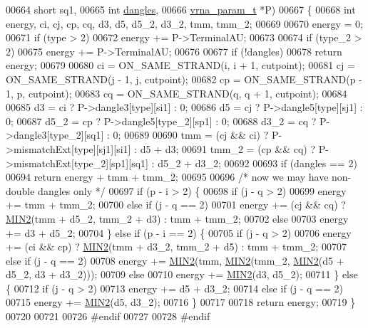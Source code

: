 \begin{DoxyCode}
00664              \textcolor{keywordtype}{short}        sq1,
00665              \textcolor{keywordtype}{int}          \hyperlink{group__model__details_ga72b511ed1201f7e23ec437e468790d74}{dangles},
00666              \hyperlink{group__energy__parameters_structvrna__param__s}{vrna\_param\_t} *P)
00667 \{
00668   \textcolor{keywordtype}{int} energy, ci, cj, cp, cq, d3, d5, d5\_2, d3\_2, tmm, tmm\_2;
00669 
00670   energy = 0;
00671   \textcolor{keywordflow}{if} (type > 2)
00672     energy += P->TerminalAU;
00673 
00674   \textcolor{keywordflow}{if} (type\_2 > 2)
00675     energy += P->TerminalAU;
00676 
00677   \textcolor{keywordflow}{if} (!dangles)
00678     \textcolor{keywordflow}{return} energy;
00679 
00680   ci  = ON\_SAME\_STRAND(i, i + 1, cutpoint);
00681   cj  = ON\_SAME\_STRAND(j - 1, j, cutpoint);
00682   cp  = ON\_SAME\_STRAND(p - 1, p, cutpoint);
00683   cq  = ON\_SAME\_STRAND(q, q + 1, cutpoint);
00684 
00685   d3    = ci  ? P->dangle3[type][si1]   : 0;
00686   d5    = cj  ? P->dangle5[type][sj1]   : 0;
00687   d5\_2  = cp  ? P->dangle5[type\_2][sp1] : 0;
00688   d3\_2  = cq  ? P->dangle3[type\_2][sq1] : 0;
00689 
00690   tmm   = (cj && ci) ? P->mismatchExt[type][sj1][si1]   : d5 + d3;
00691   tmm\_2 = (cp && cq) ? P->mismatchExt[type\_2][sp1][sq1] : d5\_2 + d3\_2;
00692 
00693   \textcolor{keywordflow}{if} (dangles == 2)
00694     \textcolor{keywordflow}{return} energy + tmm + tmm\_2;
00695 
00696   \textcolor{comment}{/* now we may have non-double dangles only */}
00697   \textcolor{keywordflow}{if} (p - i > 2) \{
00698     \textcolor{keywordflow}{if} (j - q > 2)
00699       energy += tmm + tmm\_2;
00700     \textcolor{keywordflow}{else} \textcolor{keywordflow}{if} (j - q == 2)
00701       energy += (cj && cq) ? \hyperlink{group__utils_gae0b9cd0ce090bd69b951aa73e8fa4f7d}{MIN2}(tmm + d5\_2, tmm\_2 + d3) : tmm + tmm\_2;
00702     \textcolor{keywordflow}{else}
00703       energy += d3 + d5\_2;
00704   \} \textcolor{keywordflow}{else} \textcolor{keywordflow}{if} (p - i == 2) \{
00705     \textcolor{keywordflow}{if} (j - q > 2)
00706       energy += (ci && cp) ? \hyperlink{group__utils_gae0b9cd0ce090bd69b951aa73e8fa4f7d}{MIN2}(tmm + d3\_2, tmm\_2 + d5) : tmm + tmm\_2;
00707     \textcolor{keywordflow}{else} \textcolor{keywordflow}{if} (j - q == 2)
00708       energy += \hyperlink{group__utils_gae0b9cd0ce090bd69b951aa73e8fa4f7d}{MIN2}(tmm, \hyperlink{group__utils_gae0b9cd0ce090bd69b951aa73e8fa4f7d}{MIN2}(tmm\_2, \hyperlink{group__utils_gae0b9cd0ce090bd69b951aa73e8fa4f7d}{MIN2}(d5 + d5\_2, d3 + d3\_2)));
00709     \textcolor{keywordflow}{else}
00710       energy += \hyperlink{group__utils_gae0b9cd0ce090bd69b951aa73e8fa4f7d}{MIN2}(d3, d5\_2);
00711   \} \textcolor{keywordflow}{else} \{
00712     \textcolor{keywordflow}{if} (j - q > 2)
00713       energy += d5 + d3\_2;
00714     \textcolor{keywordflow}{else} \textcolor{keywordflow}{if} (j - q == 2)
00715       energy += \hyperlink{group__utils_gae0b9cd0ce090bd69b951aa73e8fa4f7d}{MIN2}(d5, d3\_2);
00716   \}
00717 
00718   \textcolor{keywordflow}{return} energy;
00719 \}
00720 
00721 
00726 \textcolor{preprocessor}{#endif}
00727 
00728 \textcolor{preprocessor}{#endif}
\end{DoxyCode}
